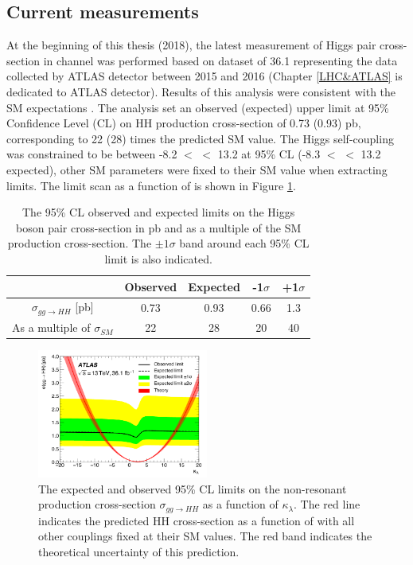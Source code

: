 \subsection{Current measurements}
\label{chap1:HH:CM}
At the beginning of this thesis (2018), the latest measurement of Higgs pair cross-section in \HHyybb channel was performed based on dataset of 36.1 \ifb representing the data collected by ATLAS detector between 2015 and 2016 (Chapter \ref{LHC&ATLAS} is dedicated to ATLAS detector). Results of this analysis were consistent with the SM expectations \cite{yybb_36ifb}. The analysis set an observed (expected) upper limit at  95\% Confidence Level (CL) on HH production cross-section of 0.73 (0.93) pb, corresponding to 22 (28) times the predicted SM value. The Higgs self-coupling was constrained to be between -8.2 $<$ \kl $<$ 13.2 at 95\% CL (-8.3 $<$ \kl $<$ 13.2 expected), other SM parameters were fixed to their SM value when extracting limits. The limit scan as a function of \kl is shown in Figure \ref{fig:chap1:HH:CM:KL}. \\

\begin{table}[htbp]
    \centering
    \begin{tabular}{ccccc}
    \hline
         & Observed & Expected & -1$\sigma$ & +1$\sigma$ \\
    \hline
        $\sigma_{gg\rightarrow HH}$ [pb] & 0.73 & 0.93 & 0.66 & 1.3 \\
        As a multiple of $\sigma_{SM}$ & 22 & 28 & 20 & 40 \\
        \hline
    \end{tabular}
    \caption{The 95\% CL observed and expected limits on the Higgs boson pair cross-section in pb and as a multiple of the SM production cross-section. The $\pm1\sigma$ band around each 95\% CL limit is also indicated.}
    \label{tab:chap1:HH:CM:XSEC}
\end{table}
\begin{figure}[htbp]
    \centering
    \includegraphics[width=0.5\textwidth]{Ch1/Img/kl_36ifb.png}
    \caption{The expected and observed 95\% CL limits on the non-resonant production cross-section $\sigma_{gg\rightarrow HH}$ as a function of $\kappa_{\lambda}$. The red line indicates the predicted HH cross-section as a function of \kl with all other couplings fixed at their SM values. The red band indicates the theoretical uncertainty of this prediction.}
    \label{fig:chap1:HH:CM:KL}
\end{figure}

